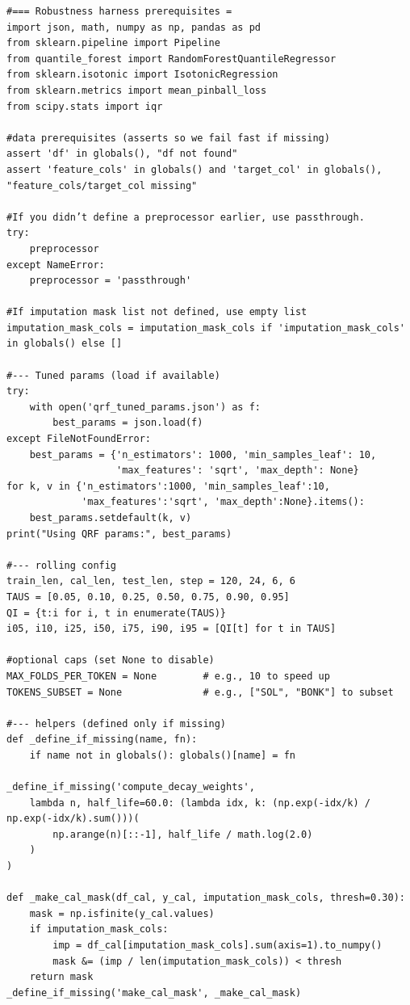 \documentclass[
  a4paper,
  DIV=11,
  numbers=noendperiod]{scrreprt}
\begin{document}
\begin{verbatim}
#=== Robustness harness prerequisites =
import json, math, numpy as np, pandas as pd
from sklearn.pipeline import Pipeline
from quantile_forest import RandomForestQuantileRegressor
from sklearn.isotonic import IsotonicRegression
from sklearn.metrics import mean_pinball_loss
from scipy.stats import iqr

#data prerequisites (asserts so we fail fast if missing) 
assert 'df' in globals(), "df not found"
assert 'feature_cols' in globals() and 'target_col' in globals(), "feature_cols/target_col missing"

#If you didn’t define a preprocessor earlier, use passthrough.
try:
    preprocessor
except NameError:
    preprocessor = 'passthrough'

#If imputation mask list not defined, use empty list
imputation_mask_cols = imputation_mask_cols if 'imputation_mask_cols' in globals() else []

#--- Tuned params (load if available) 
try:
    with open('qrf_tuned_params.json') as f:
        best_params = json.load(f)
except FileNotFoundError:
    best_params = {'n_estimators': 1000, 'min_samples_leaf': 10,
                   'max_features': 'sqrt', 'max_depth': None}
for k, v in {'n_estimators':1000, 'min_samples_leaf':10,
             'max_features':'sqrt', 'max_depth':None}.items():
    best_params.setdefault(k, v)
print("Using QRF params:", best_params)

#--- rolling config 
train_len, cal_len, test_len, step = 120, 24, 6, 6
TAUS = [0.05, 0.10, 0.25, 0.50, 0.75, 0.90, 0.95]
QI = {t:i for i, t in enumerate(TAUS)}
i05, i10, i25, i50, i75, i90, i95 = [QI[t] for t in TAUS]

#optional caps (set None to disable)
MAX_FOLDS_PER_TOKEN = None        # e.g., 10 to speed up
TOKENS_SUBSET = None              # e.g., ["SOL", "BONK"] to subset

#--- helpers (defined only if missing) 
def _define_if_missing(name, fn):
    if name not in globals(): globals()[name] = fn

_define_if_missing('compute_decay_weights',
    lambda n, half_life=60.0: (lambda idx, k: (np.exp(-idx/k) / np.exp(-idx/k).sum()))(
        np.arange(n)[::-1], half_life / math.log(2.0)
    )
)

def _make_cal_mask(df_cal, y_cal, imputation_mask_cols, thresh=0.30):
    mask = np.isfinite(y_cal.values)
    if imputation_mask_cols:
        imp = df_cal[imputation_mask_cols].sum(axis=1).to_numpy()
        mask &= (imp / len(imputation_mask_cols)) < thresh
    return mask
_define_if_missing('make_cal_mask', _make_cal_mask)


\end{verbatim}
\end{document}
